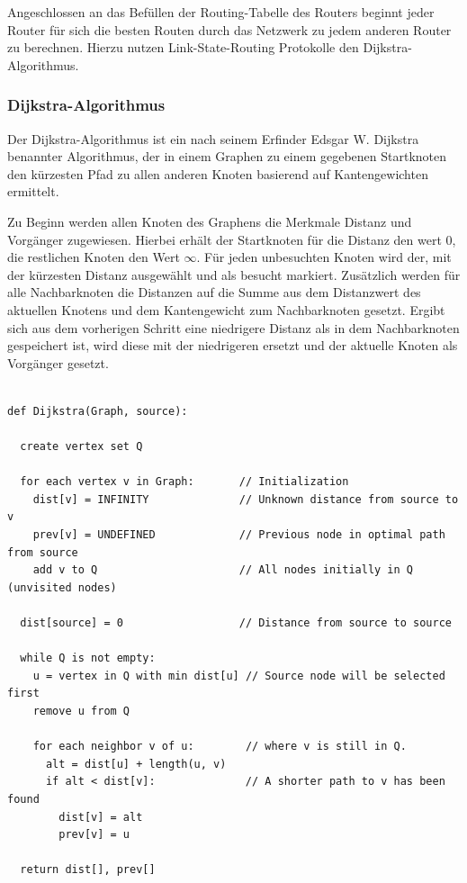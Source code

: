 \documentclass[11pt,a4paper,final]{article}
\begin{document}
Angeschlossen an das Befüllen der Routing-Tabelle des Routers beginnt jeder Router für sich die besten Routen durch das Netzwerk zu jedem anderen Router zu berechnen.
Hierzu nutzen Link-State-Routing Protokolle den Dijkstra-Algorithmus.
\subsubsection{Dijkstra-Algorithmus}
Der Dijkstra-Algorithmus ist ein nach seinem Erfinder Edsgar W. Dijkstra benannter Algorithmus, der in einem Graphen zu einem gegebenen Startknoten den kürzesten Pfad zu allen anderen Knoten basierend auf Kantengewichten ermittelt.

Zu Beginn werden allen Knoten des Graphens die Merkmale Distanz und Vorgänger zugewiesen. Hierbei erhält der Startknoten für die Distanz den wert $0$, die restlichen Knoten den Wert $\infty$.
Für jeden unbesuchten Knoten wird der, mit der kürzesten Distanz ausgewählt und als besucht markiert.
Zusätzlich werden für alle Nachbarknoten die Distanzen auf die Summe aus dem Distanzwert des aktuellen Knotens und dem Kantengewicht zum Nachbarknoten gesetzt.
Ergibt sich aus dem vorherigen Schritt eine niedrigere Distanz als in dem Nachbarknoten gespeichert ist, wird diese mit der niedrigeren ersetzt und der aktuelle Knoten als Vorgänger gesetzt.\\\\
\begin{verbatim}
def Dijkstra(Graph, source):

  create vertex set Q

  for each vertex v in Graph:       // Initialization
    dist[v] = INFINITY              // Unknown distance from source to v
    prev[v] = UNDEFINED             // Previous node in optimal path from source
    add v to Q                      // All nodes initially in Q (unvisited nodes)

  dist[source] = 0                  // Distance from source to source

  while Q is not empty:
    u = vertex in Q with min dist[u] // Source node will be selected first
    remove u from Q

    for each neighbor v of u:        // where v is still in Q.
      alt = dist[u] + length(u, v)
      if alt < dist[v]:              // A shorter path to v has been found
        dist[v] = alt
        prev[v] = u

  return dist[], prev[]
\end{verbatim}
\citep{weDijkstra}
\newpage
\end{document}
